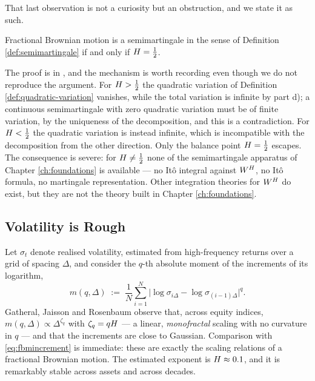 That last observation is not a curiosity but an obstruction, and we state it as such.

\begin{theorem}[Rogers]\label{thm:fbmnotsemimartingale}
Fractional Brownian motion is a semimartingale in the sense of Definition \ref{def:semimartingale}
if and only if $H = \tfrac12$. \qedopentext
\end{theorem}

The proof is in \cite{rogers1997}, and the mechanism is worth recording even though we do not
reproduce the argument. For $H > \tfrac12$ the quadratic variation of Definition
\ref{def:quadratic-variation} vanishes, while the total variation is infinite by part d); a
continuous semimartingale with zero quadratic variation must be of finite variation, by the
uniqueness of the decomposition, and this is a contradiction. For $H < \tfrac12$ the quadratic
variation is instead infinite, which is incompatible with the decomposition from the other
direction. Only the balance point $H = \tfrac12$ escapes. The consequence is severe: for
$H \neq \tfrac12$ none of the semimartingale apparatus of Chapter \ref{ch:foundations} is
available --- no Itô integral against $W^{H}$, no Itô formula, no martingale representation. Other
integration theories for $W^{H}$ do exist, but they are not the theory built in Chapter
\ref{ch:foundations}.

\subsection{Volatility is Rough}\label{subsec:roughvol}

Let $\sigma_t$ denote realised volatility, estimated from high-frequency returns over a grid of
spacing $\Delta$, and consider the $q$-th absolute moment of the increments of its logarithm,
\begin{equation}\label{eq:scalingmoment}
m(q,\Delta) \;:=\; \frac{1}{N}\sum_{i=1}^{N} \bigl|\log\sigma_{i\Delta} - \log\sigma_{(i-1)\Delta}\bigr|^{q} .
\end{equation}
Gatheral, Jaisson and Rosenbaum \cite{gatheraljaissonrosenbaum2018} observe that, across equity
indices, $m(q,\Delta) \propto \Delta^{\zeta_q}$ with
$\zeta_q = qH$ --- a linear, \emph{monofractal} scaling with no curvature in $q$ --- and that
the increments are close to Gaussian. Comparison with \eqref{eq:fbmincrement} is immediate: these
are exactly the scaling relations of a fractional Brownian motion. The estimated exponent is
$H \approx 0.1$, and it is remarkably stable across assets and across decades.

